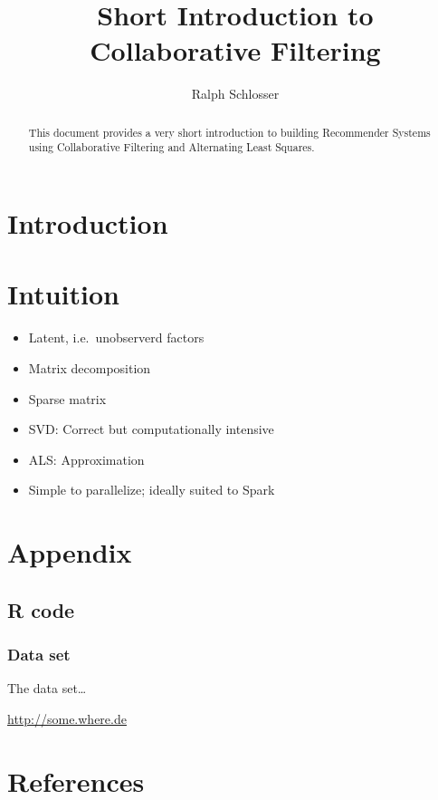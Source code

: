 \documentclass[]{elsarticle} %
\providecommand{\tightlist}{%
  \setlength{\itemsep}{0pt}\setlength{\parskip}{0pt}}
\begin{document}
\begin{frontmatter}

  \title{Short Introduction to Collaborative Filtering}
    \author[]{Ralph Schlosser}
  
    
  \begin{abstract}
  This document provides a very short introduction to building Recommender
  Systems using Collaborative Filtering and Alternating Least Squares.
  \end{abstract}
  
 \end{frontmatter}

\section{Introduction}\label{introduction}

\section{Intuition}\label{intuition}

\begin{itemize}
\tightlist
\item
  Latent, i.e.~unobserverd factors
\item
  Matrix decomposition
\item
  Sparse matrix
\item
  SVD: Correct but computationally intensive
\item
  ALS: Approximation
\item
  Simple to parallelize; ideally suited to Spark
\end{itemize}

\section{Appendix}\label{appendix}

\subsection{R code}\label{r-code}

\subsubsection{Data set}\label{data-set}

The data set\ldots{}

\url{http://some.where.de}

\section{References}\label{references}
\end{document}
